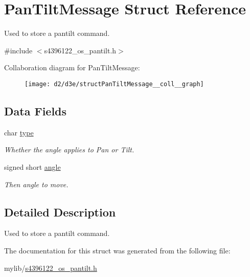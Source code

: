 \hypertarget{structPanTiltMessage}{}\section{Pan\+Tilt\+Message Struct Reference}
\label{structPanTiltMessage}


Used to store a pantilt command.  




{\ttfamily \#include $<$s4396122\+\_\+os\+\_\+pantilt.\+h$>$}



Collaboration diagram for Pan\+Tilt\+Message\+:\nopagebreak
\begin{figure}[H]
\begin{center}
\leavevmode
\texttt{[image: d2/d3e/structPanTiltMessage\_\_coll\_\_graph]}
\end{center}
\end{figure}
\subsection*{Data Fields}
\begin{DoxyCompactItemize}
\item 
char \hyperlink{structPanTiltMessage_af6ace5a01a0088c36fd6caf0aef1fd6d}{type}\hypertarget{structPanTiltMessage_af6ace5a01a0088c36fd6caf0aef1fd6d}{}\label{structPanTiltMessage_af6ace5a01a0088c36fd6caf0aef1fd6d}

\begin{DoxyCompactList}\small\item\em Whether the angle applies to Pan or Tilt. \end{DoxyCompactList}\item 
signed short \hyperlink{structPanTiltMessage_a01e22a313f9fd0585ab72af8f54b4014}{angle}\hypertarget{structPanTiltMessage_a01e22a313f9fd0585ab72af8f54b4014}{}\label{structPanTiltMessage_a01e22a313f9fd0585ab72af8f54b4014}

\begin{DoxyCompactList}\small\item\em Then angle to move. \end{DoxyCompactList}\end{DoxyCompactItemize}


\subsection{Detailed Description}
Used to store a pantilt command. 

The documentation for this struct was generated from the following file\+:\begin{DoxyCompactItemize}
\item 
mylib/\hyperlink{s4396122__os__pantilt_8h}{s4396122\+\_\+os\+\_\+pantilt.\+h}\end{DoxyCompactItemize}
